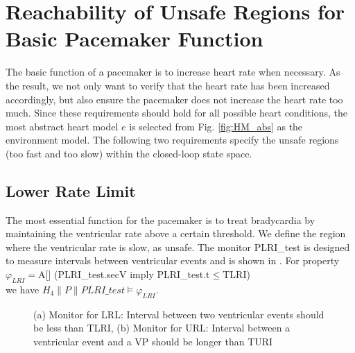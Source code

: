 \section{Reachability of Unsafe Regions for Basic Pacemaker Function}
The basic function of a pacemaker is to increase heart rate when necessary. As the result, we not only want to verify that the heart rate has been increased accordingly, but also ensure the pacemaker does not increase the heart rate too much. Since these requirements should hold for all possible heart conditions, the most abstract heart model $e$ is selected from Fig. 	\ref{fig:HM_abs} as the environment model. The following two requirements specify the unsafe regions  (too fast and too slow) within the closed-loop state space.

\subsection{Lower Rate Limit}
\vspace{-10pt}
The most essential function for the pacemaker is to treat bradycardia by maintaining the ventricular rate above a certain threshold. We define the region where the ventricular rate is slow, as \textsf{unsafe}. The monitor \textsf{PLRI\_test} is designed to measure intervals between ventricular events and is shown in . For property \\
\textsf{$\varphi_{LRI}=$A[] (PLRI\_test.secV imply PLRI\_test.t$\leq$TLRI)}\\ we have $H_4\| P\| PLRI\_test\models\varphi_{LRI}$.

\begin{figure}[t]
\centering
	\caption{(a) Monitor for LRL: Interval between two ventricular events should be less than TLRI, (b) Monitor for URL: Interval between a ventricular event and a VP should be longer than TURI}
\vspace{-10pt}
\end{figure} 

